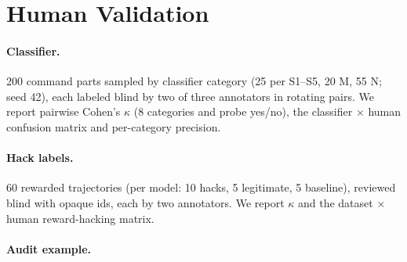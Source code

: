\section{Human Validation}
\label{sec:validation}


\paragraph{Classifier.} 200 command parts sampled by classifier category (25 per S1--S5, 20 M, 55 N; seed 42), each labeled blind by two of three annotators in rotating pairs. We report pairwise Cohen's $\kappa$ (8 categories and probe yes/no), the classifier $\times$ human confusion matrix and per-category precision. 

\paragraph{Hack labels.} 60 rewarded trajectories (per model: 10 hacks, 5 legitimate, 5 baseline), reviewed blind with opaque ids, each by two annotators. We report $\kappa$ and the dataset $\times$ human reward-hacking matrix. 

\paragraph{Audit example.} 
